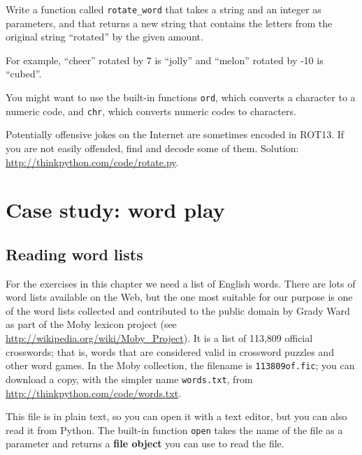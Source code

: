 \documentclass[10pt]{book}
\begin{document}
\begin{CJK}{UTF8}{gbsn}
\begin{exercise}
Write a function called \verb"rotate_word"
that takes a string and an integer as parameters, and that returns
a new string that contains the letters from the original string
``rotated'' by the given amount.  

For example, ``cheer'' rotated by 7 is ``jolly'' and ``melon'' rotated
by -10 is ``cubed''.  


You might want to use the built-in functions {\tt ord}, which converts
a character to a numeric code, and {\tt chr}, which converts numeric
codes to characters.

Potentially offensive jokes on the Internet are sometimes encoded
in ROT13.  If you are not easily offended, find and decode some
of them.  Solution: \url{http://thinkpython.com/code/rotate.py}.

\end{exercise}


\chapter{Case study: word play}

\section{Reading word lists}
\label{wordlist}

For the exercises in this chapter we need a list of English words.
There are lots of word lists available on the Web, but the one most
suitable for our purpose is one of the word lists collected and
contributed to the public domain by Grady Ward as part of the Moby
lexicon project (see \url{http://wikipedia.org/wiki/Moby_Project}).  It
is a list of 113,809 official crosswords; that is, words that are
considered valid in crossword puzzles and other word games.  In the
Moby collection, the filename is {\tt 113809of.fic}; you can download
a copy, with the simpler name {\tt words.txt}, from
\url{http://thinkpython.com/code/words.txt}.

This file is in plain text, so you can open it with a text
editor, but you can also read it from Python.  The built-in
function {\tt open} takes the name of the file as a parameter
and returns a {\bf file object} you can use to read the file.


\end{CJK}
\end{document}
